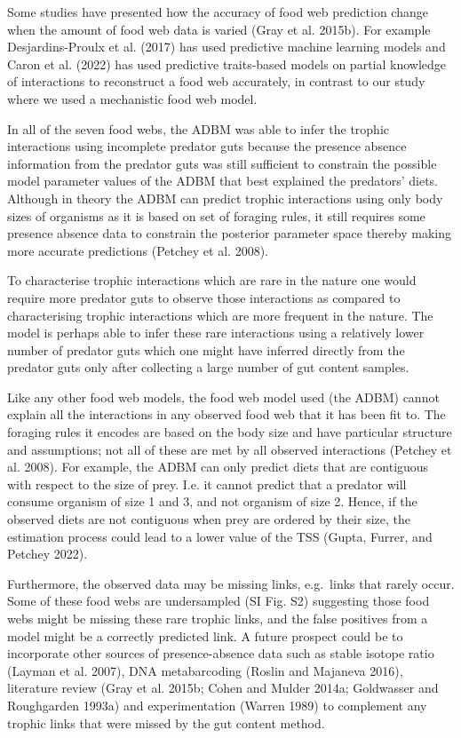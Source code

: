 \documentclass{article}
\begin{document}
Some studies have presented how the accuracy of food web prediction
change when the amount of food web data is varied (Gray et al. 2015b).
For example Desjardins-Proulx et al. (2017) has used predictive machine
learning models and Caron et al. (2022) has used predictive traits-based
models on partial knowledge of interactions to reconstruct a food web
accurately, in contrast to our study where we used a mechanistic food
web model.

In all of the seven food webs, the ADBM was able to infer the trophic
interactions using incomplete predator guts because the presence absence
information from the predator guts was still sufficient to constrain the
possible model parameter values of the ADBM that best explained the
predators' diets. Although in theory the ADBM can predict trophic
interactions using only body sizes of organisms as it is based on set of
foraging rules, it still requires some presence absence data to
constrain the posterior parameter space thereby making more accurate
predictions (Petchey et al. 2008).

To characterise trophic interactions which are rare in the nature one
would require more predator guts to observe those interactions as
compared to characterising trophic interactions which are more frequent
in the nature. The model is perhaps able to infer these rare
interactions using a relatively lower number of predator guts which one
might have inferred directly from the predator guts only after
collecting a large number of gut content samples.

Like any other food web models, the food web model used (the ADBM)
cannot explain all the interactions in any observed food web that it has
been fit to. The foraging rules it encodes are based on the body size
and have particular structure and assumptions; not all of these are met
by all observed interactions (Petchey et al. 2008). For example, the
ADBM can only predict diets that are contiguous with respect to the size
of prey. I.e. it cannot predict that a predator will consume organism of
size 1 and 3, and not organism of size 2. Hence, if the observed diets
are not contiguous when prey are ordered by their size, the estimation
process could lead to a lower value of the TSS (Gupta, Furrer, and
Petchey 2022).

Furthermore, the observed data may be missing links, e.g.~links that
rarely occur. Some of these food webs are undersampled (SI Fig. S2)
suggesting those food webs might be missing these rare trophic links,
and the false positives from a model might be a correctly predicted
link. A future prospect could be to incorporate other sources of
presence-absence data such as stable isotope ratio (Layman et al. 2007),
DNA metabarcoding (Roslin and Majaneva 2016), literature review (Gray et
al. 2015b; Cohen and Mulder 2014a; Goldwasser and Roughgarden 1993a) and
experimentation (Warren 1989) to complement any trophic links that were
missed by the gut content method.
\end{document}
